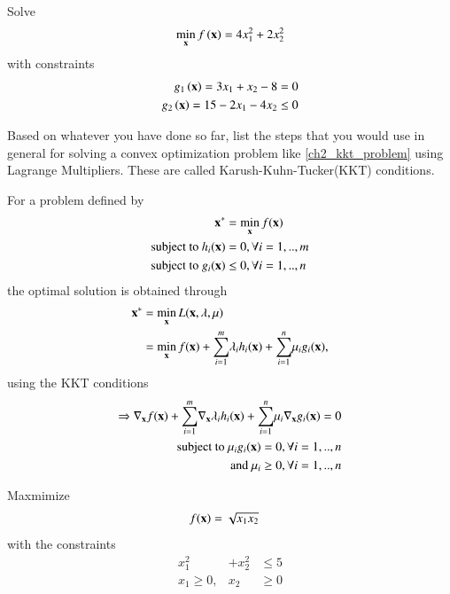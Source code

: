 \documentclass[journal,12pt,twocolumn]{IEEEtran}
\begin{document}
%
%
\begin{problem}
Solve
 \begin{align}
 \label{ch2_kkt_problem}
\min_{\mathbf{x}} f\left(\mathbf{x}\right) = 4x_1^2 + 2x_2^2
 \end{align}
 with constraints
 \begin{align}
 g_1\left(\mathbf{x}\right) = 3x_1 + x_2-8 = 0\\
 g_2 \left(\mathbf{x}\right)= 15 - 2x_1 - 4x_2 \leq 0
 \end{align}
 \end{problem}
%
\begin{problem}
Based on whatever you have done so far,	list the steps that you would use in general for solving a convex optimization problem  like \eqref{ch2_kkt_problem}  using Lagrange Multipliers. 
These are called Karush-Kuhn-Tucker(KKT) conditions.
\end{problem}
\solution For a problem defined by 
\begin{align}
\mathbf{x^*} &= \min_{\mathbf{x}}f(\mathbf{x})
\\
\text{subject to } h_i(\mathbf{x}) &= 0, \forall i=1,..,m
\\
\text{subject to } g_i(\mathbf{x}) &\le 0, \forall i=1,..,n
\end{align}
%
the optimal solution is obtained through
%
\begin{align}
\mathbf{x^*} &= \min_{\mathbf{x}}L(\mathbf{x}, \mathbf{\lambda}, \mathbf{\mu}) 
\\
&= \min_{\mathbf{x}}f(\mathbf{x})  + \underset{i=1}{\overset{m}{\sum}} \lambda_i h_i(\mathbf{x}) + \underset{i=1}{\overset{n}{\sum}} \mu_i g_i(\mathbf{x}),
\end{align}
%
using the KKT conditions
%
\begin{align}
\Rightarrow \nabla_\mathbf{x} f(\mathbf{x})  + \underset{i=1}{\overset{m}{\sum}} \nabla_\mathbf{x} \lambda_i h_i(\mathbf{x}) + \underset{i=1}{\overset{n}{\sum}} \mu_i \nabla_\mathbf{x} g_i(\mathbf{x}) = 0 
\\
\text{subject to }\mu_i g_i(\mathbf{x}) = 0, \forall i = 1,..,n
\\
\text{and }\mu_i \ge 0, \forall i = 1,..,n
\end{align}
%
\begin{problem}
	Maxmimize 
	\begin{align}
	f(\mathbf{x}) &= \sqrt{x_1x_2}
	\end{align}
	with the constraints
	\begin{align}
	x_1^2&+x_2^2 &\leq 5 \\
	x_1 \geq 0,& x_2 &\geq 0
	\end{align}
\end{problem}
\end{document}
